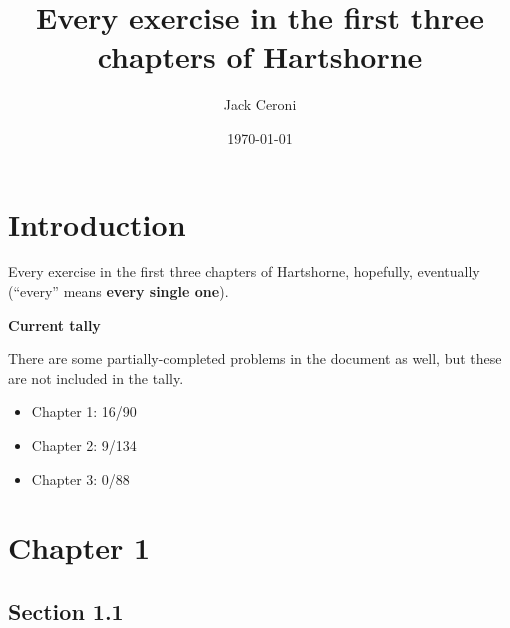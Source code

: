 \documentclass[aps,pra,showpacs,notitlepage,onecolumn,superscriptaddress,nofootinbib]{revtex4-1}
\theoremstyle{definition}
\begin{document}
\title{Every exercise in the first three chapters of Hartshorne}
\author{Jack Ceroni}
\date{\today}
\maketitle

\tableofcontents

\section{Introduction}

\noindent Every exercise in the first three chapters of Hartshorne, hopefully, eventually (``every'' means \textbf{every single one}).
\newline

\noindent \textbf{Current tally}

\noindent There are some partially-completed problems in the document as well, but these are not included in the tally.
\newline

\begin{itemize}
  \item Chapter 1: 16/90
    \item Chapter 2: 9/134
      \item Chapter 3: 0/88
  \end{itemize}

\section{Chapter 1}

\subsection{Section 1.1}
\end{document}
